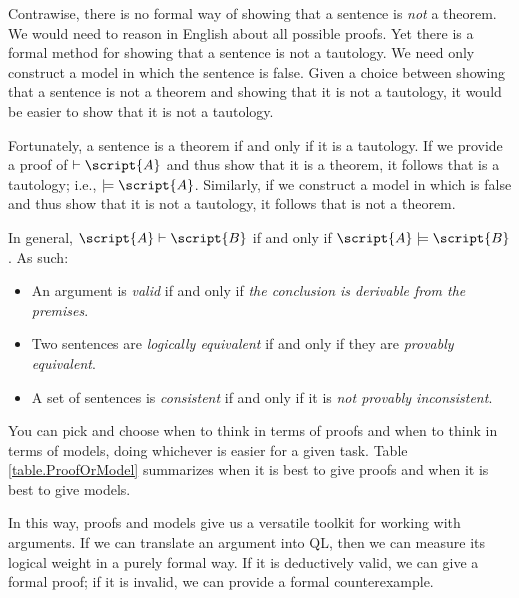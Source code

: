 Contrawise, there is no formal way of showing that a sentence is \emph{not} a theorem. We would need to reason in English about all possible proofs. Yet there is a formal method for showing that a sentence is not a tautology. We need only construct a model in which the sentence is false. Given a choice between showing that a sentence is not a theorem and showing that it is not a tautology, it would be easier to show that it is not a tautology.

Fortunately, a sentence is a theorem if and only if it is a tautology. If we provide a proof of $\vdash\script{A}$ and thus show that it is a theorem, it follows that  is a tautology; i.e., $\models\script{A}$. Similarly, if we construct a model in which  is false and thus show that it is not a tautology, it follows that  is not a theorem.

In general, $\script{A}\vdash\script{B}$ if and only if $\script{A}\models\script{B}$. As such:
\begin{itemize}
\item An argument is \emph{valid} if and only if \emph{the conclusion is derivable from the premises}.
\item Two sentences are \emph{logically equivalent} if and only if they are \emph{provably equivalent}.
\item A set of sentences is \emph{consistent} if and only if it is \emph{not provably inconsistent}.
\end{itemize}
You can pick and choose when to think in terms of proofs and when to think in terms of models, doing whichever is easier for a given task. Table \ref{table.ProofOrModel} summarizes when it is best to give proofs and when it is best to give models.

In this way, proofs and models give us a versatile toolkit for working with arguments. If we can translate an argument into QL, then we can measure its logical weight in a purely formal way. If it is deductively valid, we can give a formal proof; if it is invalid, we can provide a formal counterexample.



